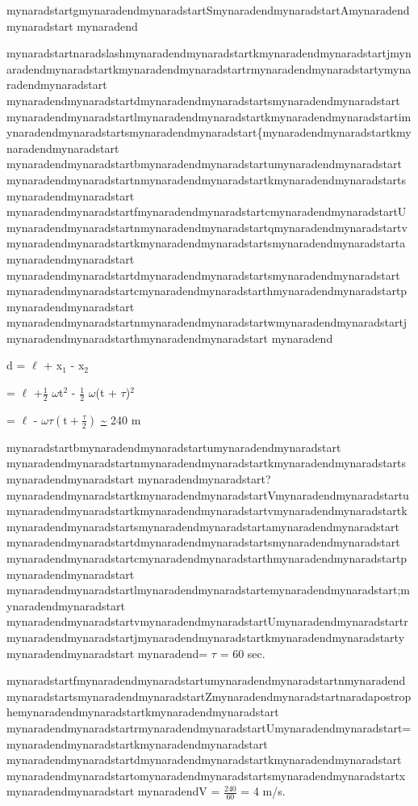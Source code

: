 \documentclass{scrbook}
\begin{document}
mynaradstartgmynaradendmynaradstartSmynaradendmynaradstartAmynaradendmynaradstart mynaradend

mynaradstartnaradslashmynaradendmynaradstartkmynaradendmynaradstartjmynaradendmynaradstartkmynaradendmynaradstartrmynaradendmynaradstartymynaradendmynaradstart mynaradendmynaradstartdmynaradendmynaradstartsmynaradendmynaradstart mynaradendmynaradstartlmynaradendmynaradstartkmynaradendmynaradstartimynaradendmynaradstartsmynaradendmynaradstart\{mynaradendmynaradstartkmynaradendmynaradstart mynaradendmynaradstartbmynaradendmynaradstartumynaradendmynaradstart mynaradendmynaradstartnmynaradendmynaradstartkmynaradendmynaradstartsmynaradendmynaradstart mynaradendmynaradstartfmynaradendmynaradstartcmynaradendmynaradstartUmynaradendmynaradstartnmynaradendmynaradstartqmynaradendmynaradstartvmynaradendmynaradstartkmynaradendmynaradstartsmynaradendmynaradstartamynaradendmynaradstart mynaradendmynaradstartdmynaradendmynaradstartsmynaradendmynaradstart mynaradendmynaradstartcmynaradendmynaradstarthmynaradendmynaradstartpmynaradendmynaradstart mynaradendmynaradstartnmynaradendmynaradstartwmynaradendmynaradstartjmynaradendmynaradstarthmynaradendmynaradstart mynaradend

 d = ${\ell}$ + x$_{1}$ - x$_{2}$

 = ${\ell}$ +$\frac{1}{2}$ ${\omega}$t$^{2}$ - $\frac{1}{2}$ ${\omega}$(t + ${\tau}$)$^{2}$ 

 = ${\ell}$ - ${\omega}{\tau}\left(\mathrm{t}+\frac{\tau }{2}\right)$ \underline{\textasciitilde{}} 240 m

mynaradstartbmynaradendmynaradstartumynaradendmynaradstart mynaradendmynaradstartnmynaradendmynaradstartkmynaradendmynaradstartsmynaradendmynaradstart mynaradendmynaradstart?mynaradendmynaradstartkmynaradendmynaradstartVmynaradendmynaradstartumynaradendmynaradstartkmynaradendmynaradstartvmynaradendmynaradstartkmynaradendmynaradstartsmynaradendmynaradstartamynaradendmynaradstart mynaradendmynaradstartdmynaradendmynaradstartsmynaradendmynaradstart mynaradendmynaradstartcmynaradendmynaradstarthmynaradendmynaradstartpmynaradendmynaradstart mynaradendmynaradstartlmynaradendmynaradstartemynaradendmynaradstart;mynaradendmynaradstart mynaradendmynaradstartvmynaradendmynaradstartUmynaradendmynaradstartrmynaradendmynaradstartjmynaradendmynaradstartkmynaradendmynaradstartymynaradendmynaradstart mynaradend= ${\tau}$ = 60 sec. 

mynaradstartfmynaradendmynaradstartumynaradendmynaradstartnmynaradendmynaradstartsmynaradendmynaradstartZmynaradendmynaradstartnaradapostrophemynaradendmynaradstartkmynaradendmynaradstart mynaradendmynaradstartrmynaradendmynaradstartUmynaradendmynaradstart=mynaradendmynaradstartkmynaradendmynaradstart mynaradendmynaradstartdmynaradendmynaradstartkmynaradendmynaradstart mynaradendmynaradstartomynaradendmynaradstartsmynaradendmynaradstartxmynaradendmynaradstart mynaradendV = $\frac{240}{60}$ = 4 m/s.
\end{document}
